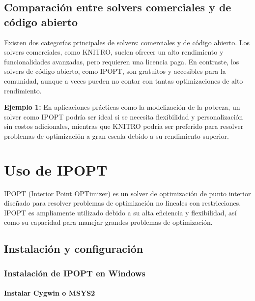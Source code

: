 \subsection{Comparación entre solvers comerciales y de código abierto}

\begin{flushleft}
	Existen dos categorías principales de solvers: comerciales y de código abierto. Los solvers comerciales, como KNITRO, suelen ofrecer un alto rendimiento y funcionalidades avanzadas, pero requieren una licencia paga. En contraste, los solvers de código abierto, como IPOPT, son gratuitos y accesibles para la comunidad, aunque a veces pueden no contar con tantas optimizaciones de alto rendimiento.
\end{flushleft}

\begin{flushleft}
	\textbf{Ejemplo 1:} En aplicaciones prácticas como la modelización de la pobreza, un solver como IPOPT podría ser ideal si se necesita flexibilidad y personalización sin costos adicionales, mientras que KNITRO podría ser preferido para resolver problemas de optimización a gran escala debido a su rendimiento superior.
\end{flushleft}

\section{Uso de IPOPT}

\begin{flushleft}
	IPOPT (Interior Point OPTimizer) es un solver de optimización de punto interior diseñado para resolver problemas de optimización no lineales con restricciones. IPOPT es ampliamente utilizado debido a su alta eficiencia y flexibilidad, así como su capacidad para manejar grandes problemas de optimización.
\end{flushleft}

\subsection{Instalación y configuración}

\subsubsection{Instalación de IPOPT en Windows}

\paragraph{Instalar Cygwin o MSYS2}

